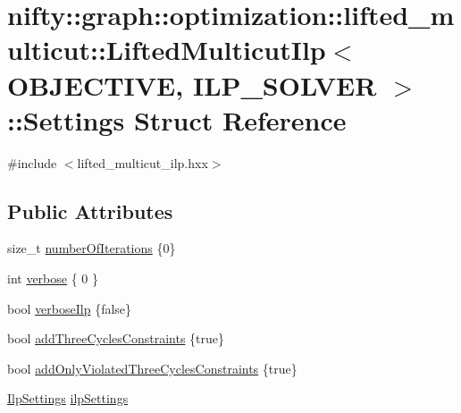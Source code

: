 \hypertarget{structnifty_1_1graph_1_1optimization_1_1lifted__multicut_1_1LiftedMulticutIlp_1_1Settings}{}\section{nifty\+:\+:graph\+:\+:optimization\+:\+:lifted\+\_\+multicut\+:\+:Lifted\+Multicut\+Ilp$<$ O\+B\+J\+E\+C\+T\+I\+V\+E, I\+L\+P\+\_\+\+S\+O\+L\+V\+E\+R $>$\+:\+:Settings Struct Reference}
\label{structnifty_1_1graph_1_1optimization_1_1lifted__multicut_1_1LiftedMulticutIlp_1_1Settings}


{\ttfamily \#include $<$lifted\+\_\+multicut\+\_\+ilp.\+hxx$>$}

\subsection*{Public Attributes}
\begin{DoxyCompactItemize}
\item 
size\+\_\+t \hyperlink{structnifty_1_1graph_1_1optimization_1_1lifted__multicut_1_1LiftedMulticutIlp_1_1Settings_ab411ff1a77aa2083662529bb75b888eb}{number\+Of\+Iterations} \{0\}
\item 
int \hyperlink{structnifty_1_1graph_1_1optimization_1_1lifted__multicut_1_1LiftedMulticutIlp_1_1Settings_a5de34f6d14b797846f34471e70a346d5}{verbose} \{ 0 \}
\item 
bool \hyperlink{structnifty_1_1graph_1_1optimization_1_1lifted__multicut_1_1LiftedMulticutIlp_1_1Settings_a03ae80e2892fc373176225518086f1a9}{verbose\+Ilp} \{false\}
\item 
bool \hyperlink{structnifty_1_1graph_1_1optimization_1_1lifted__multicut_1_1LiftedMulticutIlp_1_1Settings_a30b3ccb832cc8ce00b7f527c0b53ccc4}{add\+Three\+Cycles\+Constraints} \{true\}
\item 
bool \hyperlink{structnifty_1_1graph_1_1optimization_1_1lifted__multicut_1_1LiftedMulticutIlp_1_1Settings_a4d3d705f60616ca128bd62835be939a2}{add\+Only\+Violated\+Three\+Cycles\+Constraints} \{true\}
\item 
\hyperlink{classnifty_1_1graph_1_1optimization_1_1lifted__multicut_1_1LiftedMulticutIlp_a40ca0c5c10dbea76225245e7ab23e27d}{Ilp\+Settings} \hyperlink{structnifty_1_1graph_1_1optimization_1_1lifted__multicut_1_1LiftedMulticutIlp_1_1Settings_a7423ffb97d32d9e879388ed4fc790fcb}{ilp\+Settings}
\end{DoxyCompactItemize}


